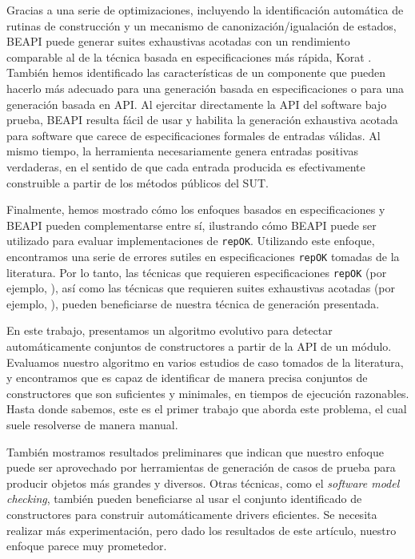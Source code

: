 Gracias a una serie de optimizaciones, incluyendo la identificación automática de 
rutinas de construcción y un mecanismo de canonización/igualación de estados, BEAPI puede generar suites exhaustivas acotadas con 
un rendimiento comparable al de la técnica basada en especificaciones más rápida, Korat \cite{Boyapati02}. También hemos identificado las
características de un componente que pueden hacerlo más adecuado para una generación basada en especificaciones o para una generación basada en API.
Al ejercitar directamente la API del software bajo prueba, BEAPI resulta fácil de usar y habilita la generación exhaustiva acotada para software que carece de especificaciones formales de entradas válidas. 
Al mismo tiempo, la herramienta necesariamente genera entradas positivas verdaderas, en el sentido de que cada entrada producida es efectivamente construible a partir de los métodos públicos del SUT.


Finalmente, hemos mostrado cómo los enfoques basados en especificaciones y BEAPI pueden complementarse entre sí, 
ilustrando cómo BEAPI puede ser utilizado para evaluar implementaciones de \texttt{repOK}. Utilizando este enfoque, 
encontramos una serie de errores sutiles en especificaciones \texttt{repOK} tomadas de la literatura. Por lo tanto, 
las técnicas que requieren especificaciones \texttt{repOK} (por ejemplo, \cite{Rosner15}), así como las técnicas que requieren 
suites exhaustivas acotadas (por ejemplo, \cite{Molina+2021}), pueden beneficiarse de nuestra técnica de generación presentada.



En este trabajo, presentamos un algoritmo evolutivo para detectar automáticamente conjuntos de constructores a partir de la API de un módulo. 
Evaluamos nuestro algoritmo en varios estudios de caso tomados de la literatura, y encontramos que es capaz de identificar de manera precisa conjuntos de constructores que son suficientes y minimales, 
en tiempos de ejecución razonables. Hasta donde sabemos, este es el primer trabajo que aborda este problema, el cual suele resolverse de manera manual.

También mostramos resultados preliminares que indican que nuestro enfoque puede ser aprovechado por herramientas de generación de casos de prueba para producir objetos más grandes y diversos. 
Otras técnicas, como el \emph{software model checking}, también pueden beneficiarse al usar el conjunto identificado de constructores para construir automáticamente drivers eficientes.
Se necesita realizar más experimentación, pero dado los resultados de este artículo, nuestro enfoque parece muy prometedor.

